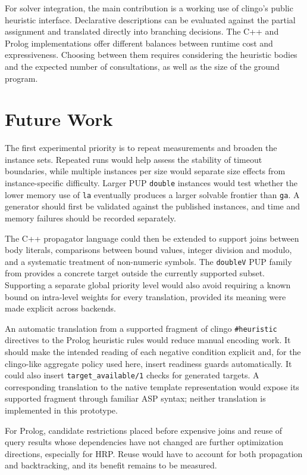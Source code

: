 For solver integration, the main contribution is a working use of clingo's public heuristic interface. Declarative descriptions can be evaluated against the partial assignment and translated directly into branching decisions. The C++ and Prolog implementations offer different balances between runtime cost and expressiveness. Choosing between them requires considering the heuristic bodies and the expected number of consultations, as well as the size of the ground program.

\section{Future Work}
\label{sec:future-work}

The first experimental priority is to repeat measurements and broaden the instance sets. Repeated runs would help assess the stability of timeout boundaries, while multiple instances per size would separate size effects from instance-specific difficulty. Larger PUP \texttt{double} instances would test whether the lower memory use of \texttt{la} eventually produces a larger solvable frontier than \texttt{ga}. A generator should first be validated against the published instances, and time and memory failures should be recorded separately.

The C++ propagator language could then be extended to support joins between body literals, comparisons between bound values, integer division and modulo, and a systematic treatment of non-numeric symbols. The \texttt{doubleV} PUP family from \cite{comploi2023dynamicAggregates} provides a concrete target outside the currently supported subset. Supporting a separate global priority level would also avoid requiring a known bound on intra-level weights for every translation, provided its meaning were made explicit across backends.

An automatic translation from a supported fragment of clingo \texttt{\#heuristic} directives to the Prolog heuristic rules would reduce manual encoding work. It should make the intended reading of each negative condition explicit and, for the clingo-like aggregate policy used here, insert readiness guards automatically. It could also insert \texttt{target\_available/1} checks for generated targets. A corresponding translation to the native template representation would expose its supported fragment through familiar ASP syntax; neither translation is implemented in this prototype.

For Prolog, candidate restrictions placed before expensive joins and reuse of query results whose dependencies have not changed are further optimization directions, especially for HRP. Reuse would have to account for both propagation and backtracking, and its benefit remains to be measured.

